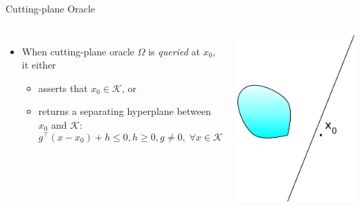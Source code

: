 \documentclass[10pt,ignorenonframetext,serif,onlymath]{beamer}
\providecommand{\tightlist}{%
  \setlength{\itemsep}{0pt}\setlength{\parskip}{0pt}}
\begin{document}
\begin{frame}{Cutting-plane Oracle}
\protect\hypertarget{sec:cutting-plane-oracle}{}

\begin{columns}


\begin{itemize}
\tightlist
\item
  When cutting-plane oracle \(\Omega\) is \emph{queried} at \(x_0\), it
  either

  \begin{itemize}
  \tightlist
  \item
    asserts that \(x_0 \in \mathcal{K}\), or
  \item
    returns a separating hyperplane between \(x_0\) and \(\mathcal{K}\):
    \[g^\top (x - x_0) + h \leq 0, h \geq 0, g \neq 0, \;
          \forall x \in \mathcal{K}\]
  \end{itemize}
\end{itemize}


\includegraphics{ellipsoid.files/cut.pdf}

\end{columns}

\end{frame}
\end{document}
